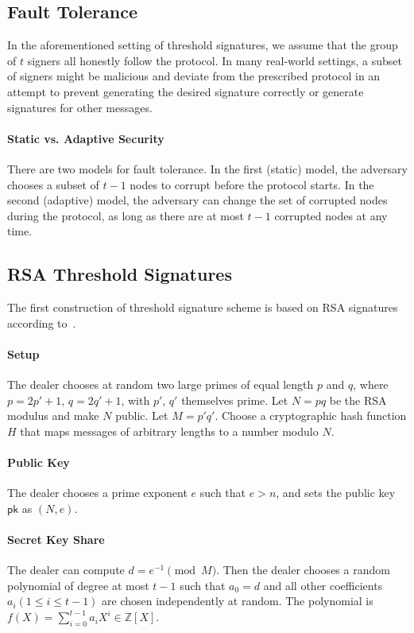 \subsection{Fault Tolerance} 
In the aforementioned setting of threshold signatures, we assume that the group of $t$ signers all honestly follow the protocol. In many real-world settings, a subset of signers might be malicious and deviate from the prescribed protocol in an attempt to prevent generating the desired signature correctly or generate signatures for other messages.  

\paragraph{Static vs. Adaptive Security} There are two models for fault tolerance. In the first (static) model, the adversary chooses a subset of $t-1$ nodes to corrupt before the protocol starts. In the second (adaptive) model, the adversary can change the set of corrupted nodes during the protocol, as long as there are at most $t-1$ corrupted nodes at any time. 

\subsection{RSA Threshold Signatures}
The first construction of threshold signature scheme is based on RSA signatures according to~\cite{DBLP:conf/eurocrypt/Shoup00}. 

\paragraph{Setup} The dealer chooses at random two large primes of equal length $p$ and $q$, where $p=2p' + 1$, $q=2q'+1$, with $p'$, $q'$ themselves prime. Let $N=pq$ be the RSA modulus and make $N$ public. Let $M=p'q'$. Choose a cryptographic hash function $H$ that maps messages of arbitrary lengths to a number modulo $N$. 

\paragraph{Public Key} The dealer chooses a prime exponent $e$ such that $e>n$, and sets the public key $\mathsf{pk}$ as $(N, e)$. 

\paragraph{Secret Key Share} The dealer can compute $d=e^{-1}\pmod{M}$. Then the dealer chooses a random polynomial of degree at most $t-1$ such that $a_0=d$ and all other coefficients $a_i (1\le i \le t-1)$ are chosen independently at random. The polynomial is $f(X) = \sum_{i=0}^{t-1}a_i X^i \in \mathbb{Z}[X]$. 

